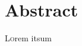 \chapter*{Abstract}
\pagestyle{especial}
{}
\lettrine[lraise=-0.1, lines=2, loversize=0.2]{L}{o}rem itsum

